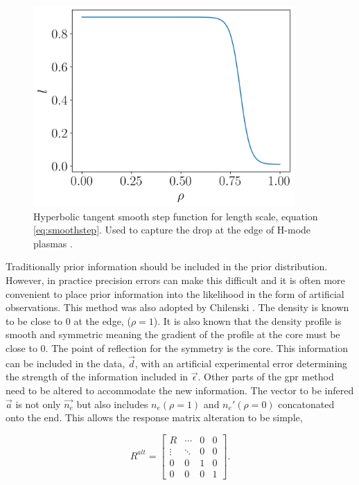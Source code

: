 \begin{figure}
  \centering
  \includegraphics[width=10cm]{images/smoothstep.png}
  \caption{Hyperbolic tangent smooth step function for length scale, equation \ref{eq:smoothstep}. Used to capture the drop at the edge of H-mode plasmas \cite{chilenski}.}
  \label{fig:smoothstep}
\end{figure}


Traditionally prior information should be included in the prior distribution. However, in practice precision errors can make this difficult and it is often more convenient to place prior information into the likelihood in the form of artificial observations. This method was also adopted by Chilenski \cite{chilenski}. The density is known to be close to 0 at the edge, ($\rho=1$). It is also known that the density profile is smooth and symmetric meaning the gradient of the profile at the core must be close to 0. The point of reflection for the symmetry is the core. This information can be included in the data, $\vec{d}$, with an artificial experimental error determining the strength of the information included in $\vec{\epsilon}$. Other parts of the \gls{gpr} method need to be altered to accommodate the new information. The vector to be infered $\vec{a}$ is not only $\vec{n_e}$ but also includes $n_e(\rho=1)$ and $n_e'(\rho=0)$ concatonated onto the end. This allows the response matrix alteration to be simple,

\begin{equation}
  R^{alt} =
  \begin{bmatrix}
    R & \cdots & 0 & 0\\
    \vdots & \ddots & 0 & 0\\
    0 & 0 & 1 & 0 \\
    0 & 0 & 0 & 1
  \end{bmatrix}.
  \label{eq:Ralt}
\end{equation}

